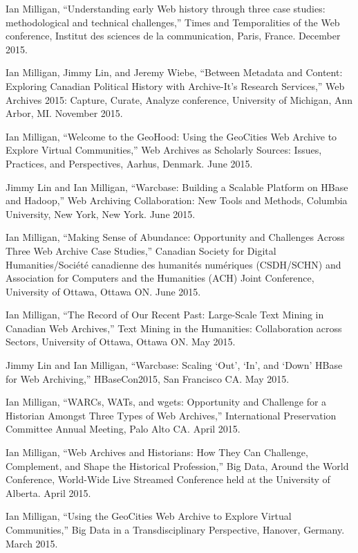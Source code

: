 \documentclass[11pt,article,oneside]{memoir}
\begin{document}
\ind Ian Milligan, ``Understanding early Web history through three case studies: methodological and technical challenges,'' Times and Temporalities of the Web conference, Institut des sciences de la communication, Paris, France. December 2015. 

\ind Ian Milligan, Jimmy Lin, and Jeremy Wiebe, ``Between Metadata and Content: Exploring Canadian Political History with Archive-It's Research Services,'' Web Archives 2015: Capture, Curate, Analyze conference, University of Michigan, Ann Arbor, MI. November 2015. 

\ind Ian Milligan, ``Welcome to the GeoHood: Using the GeoCities Web Archive to Explore Virtual Communities,'' Web Archives as Scholarly Sources: Issues, Practices, and Perspectives, Aarhus, Denmark. June 2015. 

\ind Jimmy Lin and Ian Milligan, ``Warcbase: Building a Scalable Platform on HBase and Hadoop,'' Web Archiving Collaboration: New Tools and Methods, Columbia University, New York, New York. June 2015. 

\ind Ian Milligan, ``Making Sense of Abundance: Opportunity and Challenges Across Three Web Archive Case Studies,'' Canadian Society for Digital Humanities/Soci\'et\'e canadienne des humanit\'es num\'eriques (CSDH/SCHN) and Association for Computers and the Humanities (ACH) Joint Conference, University of Ottawa, Ottawa ON. June 2015. 

\ind Ian Milligan, ``The Record of Our Recent Past: Large-Scale Text Mining in Canadian Web Archives,'' Text Mining in the Humanities: Collaboration across Sectors, University of Ottawa, Ottawa ON. May 2015. 

\ind Jimmy Lin and Ian Milligan, ``Warcbase: Scaling `Out', `In', and `Down' HBase for Web Archiving,'' HBaseCon2015, San Francisco CA. May 2015. 

\ind Ian Milligan, ``WARCs, WATs, and wgets: Opportunity and Challenge for a Historian Amongst Three Types of Web Archives,'' International Preservation Committee Annual Meeting, Palo Alto CA. April 2015. 

\ind Ian Milligan, ``Web Archives and Historians: How They Can Challenge, Complement, and Shape the Historical Profession,'' Big Data, Around the World Conference, World-Wide Live Streamed Conference held at the University of Alberta. April 2015. 

\ind Ian Milligan, ``Using the GeoCities Web Archive to Explore Virtual Communities,'' Big Data in a Transdisciplinary Perspective, Hanover, Germany. March 2015. 
\end{document}
